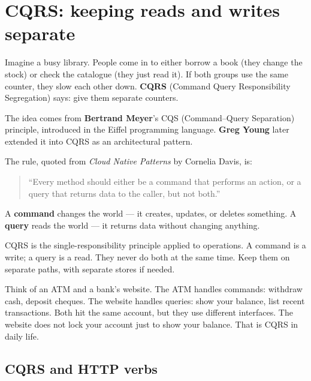 \documentclass[a4paper,11pt]{article}
\newcommand{\vocab}[1]{\textbf{\color{navy}#1}}
\begin{document}
\section{CQRS: keeping reads and writes separate}

Imagine a busy library.
People come in to either borrow a book (they change the stock) or check the catalogue
(they just read it).
If both groups use the same counter, they slow each other down.
\vocab{CQRS} (Command Query Responsibility Segregation) says: give them separate counters.

The idea comes from \textbf{Bertrand Meyer}'s CQS (Command--Query Separation) principle,
introduced in the Eiffel programming language.
\textbf{Greg Young} later extended it into CQRS as an architectural pattern.

The rule, quoted from \emph{Cloud Native Patterns} by Cornelia Davis, is:

\begin{quote}
``Every method should either be a command that performs an action,
or a query that returns data to the caller, but not both.''
\end{quote}

A \vocab{command} changes the world --- it creates, updates, or deletes something.
A \vocab{query} reads the world --- it returns data without changing anything.

\begin{intuition}
CQRS is the single-responsibility principle applied to operations.
A command is a write; a query is a read.
They never do both at the same time.
Keep them on separate paths, with separate stores if needed.
\end{intuition}

\begin{everyday}
Think of an ATM and a bank's website.
The ATM handles commands: withdraw cash, deposit cheques.
The website handles queries: show your balance, list recent transactions.
Both hit the same account, but they use different interfaces.
The website does not lock your account just to show your balance.
That is CQRS in daily life.
\end{everyday}

\subsection{CQRS and HTTP verbs}
\end{document}
